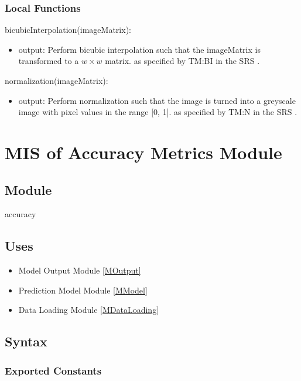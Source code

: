 \documentclass[12pt, titlepage]{article}
\begin{document}
\subsubsection{Local Functions}

\noindent bicubicInterpolation(imageMatrix):
\begin{itemize}
\item output: Perform bicubic interpolation such that the imageMatrix is
transformed to a ${w \times w}$ matrix. as specified by TM:BI in the SRS \citep[4.2.2]{SRS}.
\end{itemize}
\noindent normalization(imageMatrix):
\begin{itemize}
\item output: Perform normalization such that the image is turned into a
greyscale image with pixel values in the range [0, 1]. as specified by TM:N in
the SRS \citep[4.2.2]{SRS}.
\end{itemize}

\newpage
\section{MIS of Accuracy Metrics Module} \label{mAccuracy}

\subsection{Module}

accuracy

\subsection{Uses}

\begin{itemize}
  \item Model Output Module \ref{MOutput}
  \item Prediction Model Module \ref{MModel}
  \item Data Loading Module \ref{MDataLoading}
\end{itemize}

\subsection{Syntax}

\subsubsection{Exported Constants}
\end{document}
